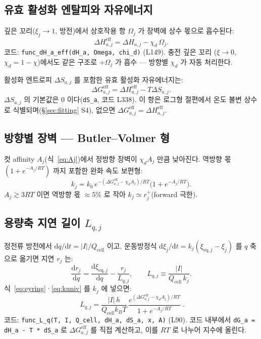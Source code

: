 \documentclass[11pt,a4paper]{article}
\newcommand{\dd}{\mathrm{d}}
\newcommand{\eq}{\mathrm{eq}}
\newcommand{\eff}{\mathrm{eff}}
\newcommand{\cell}{\mathrm{cell}}
\begin{document}
\subsection{유효 활성화 엔탈피와 자유에너지}

깊은 꼬리($\xi_j\to1$, 방전)에서 상호작용 항 $\Omega_j$ 가 장벽에 상수 몫으로
흡수된다:
\begin{equation}
\Delta H_{a,j}^\eff = \Delta H_{a,j} - \chi_d\,\Omega_j.
\label{eq:dHeff}
\end{equation}
코드: \texttt{func\_dH\_a\_eff(dH\_a, Omega, chi\_d)} (L149). 충전 깊은 꼬리
($\xi\to0$, $\chi_d=1-\chi$)에서도 같은 구조로 $+\Omega_j$ 가 흡수 — 방향별
$\chi_d$ 가 자동 처리한다.

활성화 엔트로피 $\Delta S_{a,j}$ 를 포함한 유효 활성화 자유에너지는:
\begin{equation}
\Delta G_{a,j}^\eff = \Delta H_{a,j}^\eff - T\Delta S_{a,j}.
\label{eq:dGeff}
\end{equation}
$\Delta S_{a,j}$ 의 기본값은 $0$ 이다(\texttt{dS\_a}, 코드 L338). 이 항은 로그형 절편에서
온도 불변 상수로 식별되며(\S\ref{sec:fitting} S4), 없으면 $\Delta G_{a,j}^\eff = \Delta H_{a,j}^\eff$.

\subsection{방향별 장벽 — Butler--Volmer 형}

컷 affinity $A_j$(식~\eqref{eq:Aj})에서 정방향 장벽이 $\chi_d A_j$ 만큼 낮아진다.
역방향 몫 $(1+e^{-A_j/RT})$ 까지 포함한 완화 속도 보편형:
\begin{equation}
k_j = k_0\,e^{-(\Delta G_{a,j}^\eff-\chi_dA_j)/RT}\bigl(1+e^{-A_j/RT}\bigr).
\label{eq:kuniv}
\end{equation}
$A_j \gtrsim 3RT$ 이면 역방향 몫 $\approx 5\%$ 로 작아 $k_j \simeq r_j^+$(forward 극한).

\subsection{용량축 지연 길이 $L_{q,j}$}

정전류 방전에서 $\dd q/\dd t = |I|/Q_\cell$ 이고, 운동방정식
$\dd\xi_j/\dd t = k_j(\xi_{\eq,j}-\xi_j)$ 를 $q$ 축으로 옮기면 지연 $r_j$ 는:
\begin{equation}
\frac{\dd r_j}{\dd q} = \frac{\dd\xi_{\eq,j}}{\dd q} - \frac{r_j}{L_{q,j}},\qquad
L_{q,j} \equiv \frac{|I|}{Q_\cell\,k_j}.
\label{eq:relaxq}
\end{equation}
식~\eqref{eq:eyring}·\eqref{eq:kuniv} 를 $k_j$ 에 넣으면:
\begin{equation}
\boxed{\;L_{q,j} = \frac{|I|\,h}{Q_\cell k_BT}\,
  \frac{e^{(\Delta G_{a,j}^\eff - \chi_d A_j)/RT}}{1 + e^{-A_j/RT}}\;.}
\label{eq:Lq}
\end{equation}
코드: \texttt{func\_L\_q(T, I, Q\_cell, dH\_a, dS\_a, x, A)} (L90). 코드 내부에서
\texttt{dG\_a = dH\_a - T * dS\_a} 로 $\Delta G_{a,j}^\eff$ 를 직접 계산하고, 이를
$RT$ 로 나누어 지수에 올린다.
\end{document}
